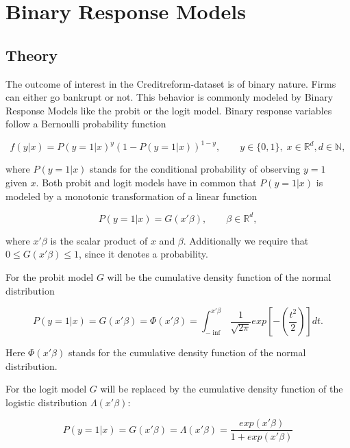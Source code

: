 \documentclass{article}
\begin{document}
\section{Binary Response Models}
\subsection{Theory}

The outcome of interest in the Creditreform-dataset is of binary nature. Firms can either go bankrupt or not. This behavior is commonly modeled by Binary Response Models like the probit or the logit model. Binary response variables follow a Bernoulli probability function

\begin{equation}
f(y|x) = P(y=1|x)^y\left(1-P(y=1|x)\right)^{1-y},\qquad y\in \{0,1\},\; x\in \mathbb{R}^d, d \in \mathbb{N},
\end{equation}

where $P(y=1|x)$ stands for the conditional probability of observing $y=1$ given $x$. Both probit and logit models have in common that $P(y=1|x)$ is modeled by a monotonic transformation of a linear function

\begin{equation}
P(y=1|x) = G(x \prime \beta), \qquad \beta \in \mathbb{R}^d,
\end{equation}

where $x \prime \beta$ is the scalar product of $x$ and $\beta$. Additionally we require that $0 \leq G(x \prime \beta) \leq 1$, since it denotes a probability.

For the probit model $G$ will be the cumulative density function of the normal distribution

\begin{equation}
P(y=1|x) = G(x \prime \beta) = \Phi(x \prime \beta) = \int_{-\inf}^{x \prime \beta} \frac{1}{\sqrt{2\pi}}exp\left[-(\frac{t^2}{2})\right]dt.
\end{equation}

Here $\Phi(x \prime \beta)$ stands for the cumulative density function of the normal distribution.

For the logit model $G$ will be replaced by the cumulative density function of the logistic distribution $\Lambda(x \prime \beta)$:

\begin{equation}
P(y=1|x) = G(x \prime \beta) = \Lambda(x \prime \beta) = \frac{exp(x \prime \beta)}{1+exp(x \prime \beta)}
\end{equation}\cite{winkel09}
\end{document}
